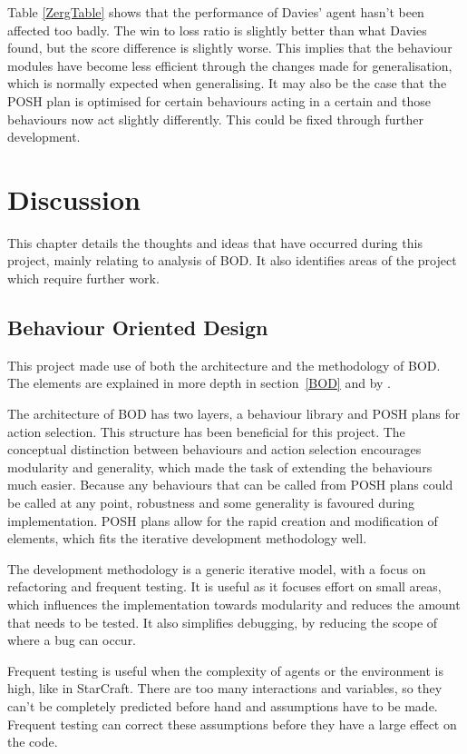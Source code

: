 \documentclass[11pt,openright,a4paper]{report}
\begin{document}
Table \ref{ZergTable} shows that the performance of Davies' agent hasn't been affected too badly. The win to loss ratio is slightly better than what Davies found, but the score difference is slightly worse. This implies that the behaviour modules have become less efficient through the changes made for generalisation, which is normally expected when generalising. It may also be the case that the POSH plan is optimised for certain behaviours acting in a certain and those behaviours now act slightly differently. This could be fixed through further development.


\chapter{Discussion}
\label{Discussion}
This chapter details the thoughts and ideas that have occurred during this project, mainly relating to analysis of BOD. It also identifies areas of the project which require further work.
\section{Behaviour Oriented Design}
This project made use of both the architecture and the methodology of BOD. The elements are explained in more depth in section~\ref{BOD} and by .

The architecture of BOD has two layers, a behaviour library and POSH plans for action selection. This structure has been beneficial for this project. The conceptual distinction between behaviours and action selection encourages modularity and generality, which made the task of extending the behaviours much easier. Because any behaviours that can be called from POSH plans could be called at any point, robustness and some generality is favoured during implementation.  POSH plans allow for the rapid creation and modification of elements, which fits the iterative development methodology well.

The development methodology is a generic iterative model, with a focus on refactoring and frequent testing. It is useful as it focuses effort on small areas, which influences the implementation towards modularity and reduces the amount that needs to be tested. It also simplifies debugging, by reducing the scope of where a bug can occur.

Frequent testing is useful when the complexity of agents or the environment is high, like in StarCraft. There are too many interactions and variables, so they can't be completely predicted before hand and assumptions have to be made. Frequent testing can correct these assumptions before they have a large effect on the code.
\end{document}
